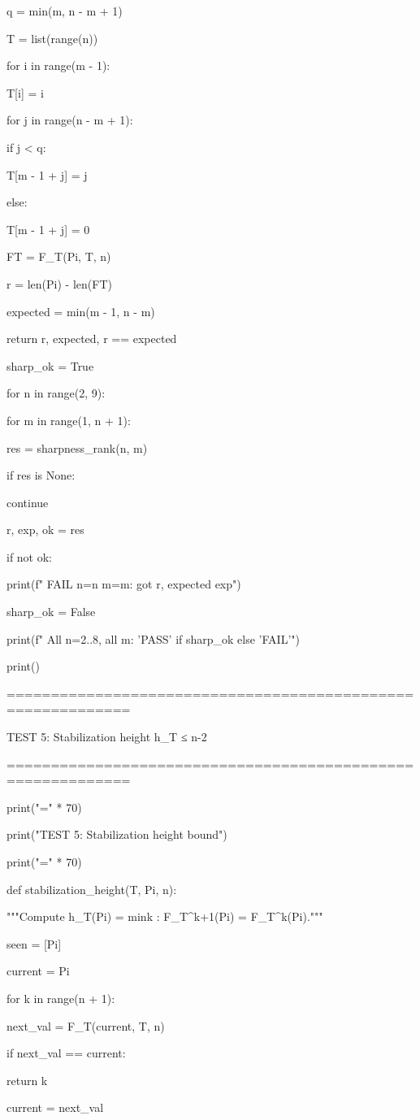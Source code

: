q = min(m, n - m + 1)

T = list(range(n))

for i in range(m - 1):

T[i] = i

for j in range(n - m + 1):

if j < q:

T[m - 1 + j] = j

else:

T[m - 1 + j] = 0

FT = F_T(Pi, T, n)

r = len(Pi) - len(FT)

expected = min(m - 1, n - m)

return r, expected, r == expected


sharp_ok = True

for n in range(2, 9):

for m in range(1, n + 1):

res = sharpness_rank(n, m)

if res is None:

continue

r, exp, ok = res

if not ok:

print(f"  FAIL n={n} m={m}: got {r}, expected {exp}")

sharp_ok = False


print(f"  All n=2..8, all m: {'PASS' if sharp_ok else 'FAIL'}")

print()


============================================================


TEST 5: Stabilization height h_T ≤ n-2


============================================================


print("=" * 70)

print("TEST 5: Stabilization height bound")

print("=" * 70)


def stabilization_height(T, Pi, n):

"""Compute h_T(Pi) = min{k : F_T^{k+1}(Pi) = F_T^k(Pi)}."""

seen = [Pi]

current = Pi

for k in range(n + 1):

next_val = F_T(current, T, n)

if next_val == current:

return k

current = next_val

